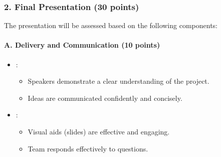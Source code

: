 \documentclass[letterpaper,10pt,english]{jupyterBook}
\begin{document}
\subsubsection{2. Final Presentation (30 points)}
\label{\detokenize{ProjectInstructions:id24}}
\sphinxAtStartPar
The presentation will be assessed based on the following components:


\paragraph{A. Delivery and Communication (10 points)}
\label{\detokenize{ProjectInstructions:id25}}\begin{itemize}
\item {} 
\sphinxAtStartPar
{}:
\begin{itemize}
\item {} 
\sphinxAtStartPar
Speakers demonstrate a clear understanding of the project.

\item {} 
\sphinxAtStartPar
Ideas are communicated confidently and concisely.

\end{itemize}

\item {} 
\sphinxAtStartPar
{}:
\begin{itemize}
\item {} 
\sphinxAtStartPar
Visual aids (slides) are effective and engaging.

\item {} 
\sphinxAtStartPar
Team responds effectively to questions.

\end{itemize}

\end{itemize}
\end{document}
